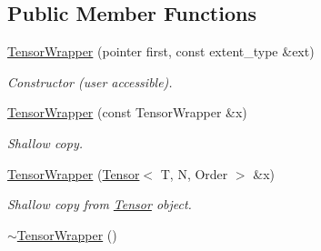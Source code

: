 \subsection*{Public Member Functions}
\begin{DoxyCompactItemize}
\item 
\hypertarget{classbtas_1_1_tensor_wrapper_3_01_t_01_5_00_01_n_00_01_order_01_4_a6638f0d7dade8f18f1f7eb9ed8eecf1b}{
\hyperlink{classbtas_1_1_tensor_wrapper_3_01_t_01_5_00_01_n_00_01_order_01_4_a6638f0d7dade8f18f1f7eb9ed8eecf1b}{TensorWrapper} (pointer first, const extent\_\-type \&ext)}
\label{classbtas_1_1_tensor_wrapper_3_01_t_01_5_00_01_n_00_01_order_01_4_a6638f0d7dade8f18f1f7eb9ed8eecf1b}

\begin{DoxyCompactList}\small\item\em Constructor (user accessible). \item\end{DoxyCompactList}\item 
\hypertarget{classbtas_1_1_tensor_wrapper_3_01_t_01_5_00_01_n_00_01_order_01_4_a27fbfee6deee23cf457962a1a4bc195a}{
\hyperlink{classbtas_1_1_tensor_wrapper_3_01_t_01_5_00_01_n_00_01_order_01_4_a27fbfee6deee23cf457962a1a4bc195a}{TensorWrapper} (const TensorWrapper \&x)}
\label{classbtas_1_1_tensor_wrapper_3_01_t_01_5_00_01_n_00_01_order_01_4_a27fbfee6deee23cf457962a1a4bc195a}

\begin{DoxyCompactList}\small\item\em Shallow copy. \item\end{DoxyCompactList}\item 
\hypertarget{classbtas_1_1_tensor_wrapper_3_01_t_01_5_00_01_n_00_01_order_01_4_ab19847e9c6f28ef5c67325b5aadb3ace}{
\hyperlink{classbtas_1_1_tensor_wrapper_3_01_t_01_5_00_01_n_00_01_order_01_4_ab19847e9c6f28ef5c67325b5aadb3ace}{TensorWrapper} (\hyperlink{classbtas_1_1_tensor}{Tensor}$<$ T, N, Order $>$ \&x)}
\label{classbtas_1_1_tensor_wrapper_3_01_t_01_5_00_01_n_00_01_order_01_4_ab19847e9c6f28ef5c67325b5aadb3ace}

\begin{DoxyCompactList}\small\item\em Shallow copy from \hyperlink{classbtas_1_1_tensor}{Tensor} object. \item\end{DoxyCompactList}\item 
\hypertarget{classbtas_1_1_tensor_wrapper_3_01_t_01_5_00_01_n_00_01_order_01_4_a759644d7c3fe7dfed967e9967cd276a1}{
\hyperlink{classbtas_1_1_tensor_wrapper_3_01_t_01_5_00_01_n_00_01_order_01_4_a759644d7c3fe7dfed967e9967cd276a1}{$\sim$TensorWrapper} ()}
\label{classbtas_1_1_tensor_wrapper_3_01_t_01_5_00_01_n_00_01_order_01_4_a759644d7c3fe7dfed967e9967cd276a1}


\end{DoxyCompactItemize}
